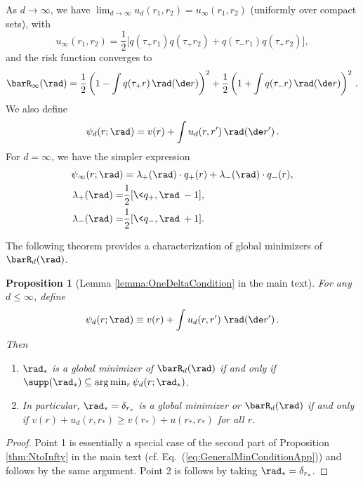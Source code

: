 \documentclass[11pt]{article}
\newtheorem{proposition}{Proposition}
\begin{document}
As $d\to\infty$, we have $\lim _{d\to\infty}u_d(r_1,r_2) = u_{\infty}(r_1,r_2)$ (uniformly over compact sets), with
\begin{equation}\label{eqn:u_infty_isotropic}
u_{\infty}(r_1,r_2)=\frac{1}{2}\Big[q(\tau_+r_1) q(\tau_+r_2)+ q(\tau_-r_1) q(\tau_+r_2)\Big],
\end{equation}
and the risk function converges to
%
\begin{align}\label{eqn:Risk_infinite_isotropic}
%
\barR_{\infty}(\rad)= \frac{1}{2}\left(1-\int q(\tau_+r)\, \rad(\de r)\right)^2+\frac{1}{2}\left(1+\int q(\tau_- r)\, \rad(\de r)\right)^2\, .
%
\end{align}
%
We also define
%
\begin{align}
%
\psi_d(r;\rad) = v(r) +\int u_d(r,r') \, \rad(\de r')\, .
%
\end{align}
%
For  $d=\infty$, we have the simpler expression
\begin{align}
\psi_\infty(r; \rad) &= \lambda_+(\rad) \cdot q_+(r) + \lambda_-(\rad) \cdot q_-(r) \label{eq:psi_infty_isotropic_description},\\
\lambda_+(\rad) =& \frac{1}{2} [ \< q_+, \rad\> - 1 ], \label{eq:LambdaPlus}\\
\lambda_-(\rad) =& \frac{1}{2} [ \< q_-, \rad\> + 1 ].  \label{eq:LambdaMinus}
\end{align}
 

The following theorem provides a characterization of global minimizers of $\barR_d(\rad)$.  
%
\begin{proposition}[Lemma \ref{lemma:OneDeltaCondition} in the main text]\label{propo:MinGeneralD}
For any $d\le\infty$, define 
%
\begin{align}
\psi_d(r;\rad) \equiv v(r)+\int u_d(r, r')\;\rad(\de r')\, .
\end{align}
%
Then 
%
\begin{enumerate}
\item $\rad_*$ is a global minimizer
of $\barR_d(\rad)$ if and only if $\supp(\rad_*)\subseteq \arg\min_{r} \psi_d(r;\rad_*)$.
\item In particular, $\rad_* =\delta_{r_*}$ is a global minimizer or $\barR_d(\rad)$ if and only if $v(r)+u_d(r,r_*)\ge v(r_*)+u(r_*,r_*)$ 
for all $r$.
\end{enumerate}
\end{proposition}
%
\begin{proof}
Point 1 is essentially a special case of the second part of Proposition \ref{thm:NtoInfty} in the main text
 (cf. Eq.~(\ref{eq:GeneralMinConditionApp})) and follows by the same argument.
Point 2 is follows by taking $\rad_*=\delta_{r_*}$.
\end{proof}
%
\end{document}
